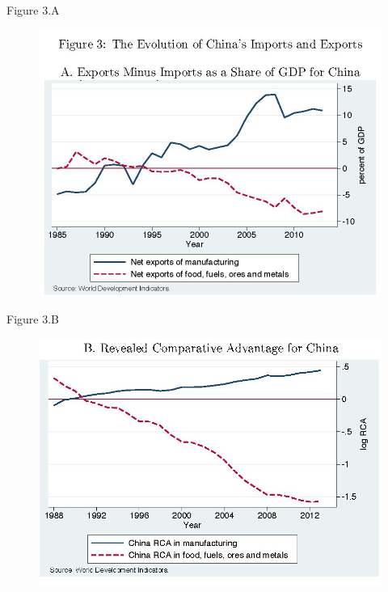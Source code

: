\documentclass[aspectratio=169]{beamer}
\begin{document}

\begin{frame}{Figure 3.A}

\begin{figure}
    \centering
    \includegraphics[scale=0.8]{AutorDornHansonFig3a.jpg}
    \label{fig:fig3a}
\end{figure}
    
\end{frame}


\begin{frame}{Figure 3.B}

\begin{figure}
    \centering
    \includegraphics[scale=0.85]{AutorDornHansonFig3b.jpg}
    \label{fig:fig3b}
\end{figure}
    
\end{frame}
\end{document}
